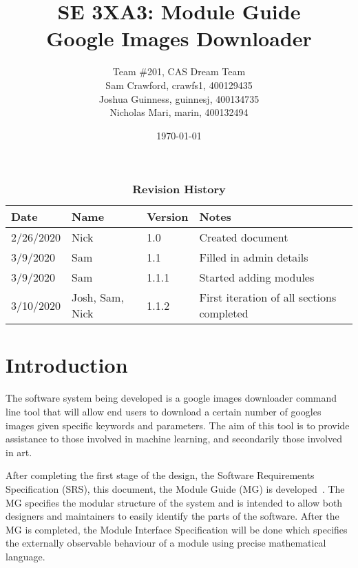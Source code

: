 \documentclass[12pt, titlepage]{article}
\title{SE 3XA3: Module Guide\\Google Images Downloader}
\author{Team \#201, CAS Dream Team
		\\ Sam Crawford, crawfs1, 400129435
		\\ Joshua Guinness, guinnesj, 400134735
		\\ Nicholas Mari, marin, 400132494
}
\date{\today}
\begin{document}
\maketitle

\tableofcontents
\listoftables
\listoffigures

\begin{table}[tp]
\begin{tabularx}{\textwidth}{lllp{7.5cm}}
\toprule {\bf Date} & {\bf Name} & {\bf Version} & {\bf Notes}\\
\midrule
2/26/2020 & Nick & 1.0 & Created document\\
3/9/2020 & Sam & 1.1 & Filled in admin details\\
3/9/2020 & Sam & 1.1.1 & Started adding modules\\
3/10/2020 & Josh, Sam, Nick & 1.1.2 & First iteration of all sections completed\\
\bottomrule
\end{tabularx}
\caption{\bf Revision History}
\end{table}


\newpage


\section{Introduction}

The software system being developed is a google images downloader command line tool that
will allow end users to download a certain number of googles images given
specific keywords and parameters. The aim of this tool is to provide assistance to those
involved in machine learning, and secondarily those involved in art.

After completing the first stage of the design, the Software Requirements Specification (SRS), this document, the Module Guide (MG) is developed~\citep{ParnasEtAl1984}. The MG
specifies the modular structure of the system and is intended to allow both
designers and maintainers to easily identify the parts of the software. After the MG is completed, the Module Interface Specification will be done which specifies the externally observable behaviour of a module using precise mathematical language.
\end{document}
